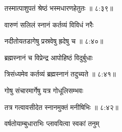 
{\devanagarifont तस्मात्पाशुपतं श्रेष्ठं भस्मधारणहेतुतः {॥ ८:३९॥} \veg\dontdisplaylinenum }%



{\devanagarifont वारुणं सलिलं स्नानं कर्तव्यं विविधं नरैः \thinspace{\dandab} \dontdisplaylinenum }%


{\devanagarifont नदीतोयतडागेषु प्रस्रवेषु ह्रदेषु च {॥ ८:४०॥} \veg\dontdisplaylinenum }%



{\devanagarifont ब्रह्मस्नानं च विप्रेन्द्र आपोहिष्ठं विदुर्बुधाः \thinspace{\dandab} \dontdisplaylinenum }%


{\devanagarifont त्रिसंध्यमेव कर्तव्यं ब्रह्मस्नानं तदुच्यते {॥ ८:४१॥} \veg\dontdisplaylinenum }%
 


{\devanagarifont गोषु संचारमार्गेषु यत्र गोधूलिसम्भवः \thinspace{\dandab} \dontdisplaylinenum }%
 

{\devanagarifont तत्र गत्वावसीदेत स्नानमुक्तं मनीषिभिः {॥ ८:४२॥} \veg\dontdisplaylinenum }%



{\devanagarifont वर्षतोयाम्बुधाराभिः प्लावयित्वा स्वकां तनुम् \thinspace{\dandab} \dontdisplaylinenum }%

